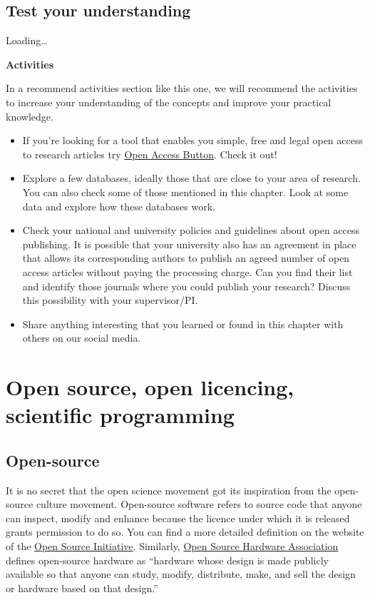 \documentclass[
]{book}
\begin{document}
\hypertarget{test-your-understanding-1}{%
\section{Test your understanding}\label{test-your-understanding-1}}

Loading\ldots{}

\textbf{Activities}

In a recommend activities section like this one, we will recommend the activities to increase your understanding of the concepts and improve your practical knowledge.

\begin{itemize}
\item
  If you're looking for a tool that enables you simple, free and legal open access to research articles try \href{https://openaccessbutton.org/}{Open Access Button}. Check it out!
\item
  Explore a few databases, ideally those that are close to your area of research. You can also check some of those mentioned in this chapter. Look at some data and explore how these databases work.
\item
  Check your national and university policies and guidelines about open access publishing. It is possible that your university also has an agreement in place that allows its corresponding authors to publish an agreed number of open access articles without paying the processing charge. Can you find their list and identify those journals where you could publish your research? Discuss this possibility with your supervisor/PI.
\item
  Share anything interesting that you learned or found in this chapter with others on our social media.
\end{itemize}

\hypertarget{open-source-open-licencing-scientific-programming}{%
\chapter{Open source, open licencing, scientific programming}\label{open-source-open-licencing-scientific-programming}}

\hypertarget{open-source}{%
\section{Open-source}\label{open-source}}

It is no secret that the open science movement got its inspiration from the open-source culture movement. Open-source software refers to source code that anyone can inspect, modify and enhance because the licence under which it is released grants permission to do so. You can find a more detailed definition on the website of the \href{https://opensource.org/osd}{Open Source Initiative}. Similarly, \href{https://www.oshwa.org/definition/}{Open Source Hardware Association} defines open-source hardware as ``hardware whose design is made publicly available so that anyone can study, modify, distribute, make, and sell the design or hardware based on that design.''
\end{document}

